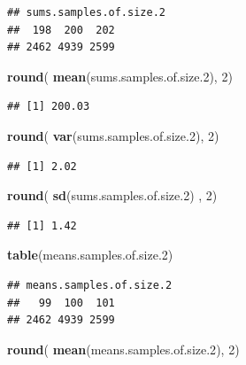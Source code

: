 \documentclass[
]{article}
\newenvironment{Shaded}{\begin{snugshade}}{\end{snugshade}}
\newcommand{\DecValTok}[1]{\textcolor[rgb]{0.00,0.00,0.81}{#1}}
\newcommand{\FloatTok}[1]{\textcolor[rgb]{0.00,0.00,0.81}{#1}}
\newcommand{\KeywordTok}[1]{\textcolor[rgb]{0.13,0.29,0.53}{\textbf{#1}}}
\newcommand{\NormalTok}[1]{#1}
\begin{document}
\begin{verbatim}
## sums.samples.of.size.2
##  198  200  202 
## 2462 4939 2599
\end{verbatim}

\begin{Shaded}
\begin{Highlighting}[]
\KeywordTok{round}\NormalTok{( }\KeywordTok{mean}\NormalTok{(sums.samples.of.size}\FloatTok{.2}\NormalTok{), }\DecValTok{2}\NormalTok{)}
\end{Highlighting}
\end{Shaded}

\begin{verbatim}
## [1] 200.03
\end{verbatim}

\begin{Shaded}
\begin{Highlighting}[]
\KeywordTok{round}\NormalTok{( }\KeywordTok{var}\NormalTok{(sums.samples.of.size}\FloatTok{.2}\NormalTok{), }\DecValTok{2}\NormalTok{)}
\end{Highlighting}
\end{Shaded}

\begin{verbatim}
## [1] 2.02
\end{verbatim}

\begin{Shaded}
\begin{Highlighting}[]
\KeywordTok{round}\NormalTok{( }\KeywordTok{sd}\NormalTok{(sums.samples.of.size}\FloatTok{.2}\NormalTok{) , }\DecValTok{2}\NormalTok{)}
\end{Highlighting}
\end{Shaded}

\begin{verbatim}
## [1] 1.42
\end{verbatim}

\begin{Shaded}
\begin{Highlighting}[]
\KeywordTok{table}\NormalTok{(means.samples.of.size}\FloatTok{.2}\NormalTok{)}
\end{Highlighting}
\end{Shaded}

\begin{verbatim}
## means.samples.of.size.2
##   99  100  101 
## 2462 4939 2599
\end{verbatim}

\begin{Shaded}
\begin{Highlighting}[]
\KeywordTok{round}\NormalTok{( }\KeywordTok{mean}\NormalTok{(means.samples.of.size}\FloatTok{.2}\NormalTok{), }\DecValTok{2}\NormalTok{)}
\end{Highlighting}
\end{Shaded}
\end{document}
